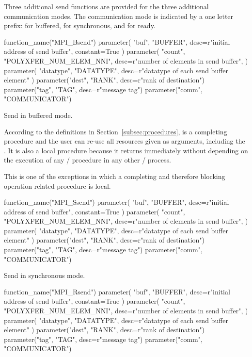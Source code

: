 Three additional send functions are provided for the three additional
communication
modes.  The communication mode is indicated by a one letter prefix:
 for buffered,
 for synchronous, and
 for ready.

\begin{mpi-binding}
    function_name("MPI_Bsend")
    parameter(
        "buf", "BUFFER", desc=r"initial address of send buffer", constant=True
    )
    parameter(
        "count",
        "POLYXFER_NUM_ELEM_NNI",
        desc=r"number of elements in send buffer",
    )
    parameter(
        "datatype", "DATATYPE", desc=r"datatype of each send buffer element"
    )
    parameter("dest", "RANK", desc=r"rank of destination")
    parameter("tag", "TAG", desc=r"message tag")
    parameter("comm", "COMMUNICATOR")
\end{mpi-binding}

Send in buffered mode.

According to the definitions in Section~\ref{subsec:procedures},
 is a completing procedure and the user can re-use
all resources given as arguments, including the .
It is also a local procedure because it returns immediately without
depending on the execution of any \MPI/ procedure in any other \MPI/ process.
\begin{users}
This is one of the exceptions in which a completing and therefore blocking operation-related procedure is local.
\end{users}

\begin{mpi-binding}
    function_name("MPI_Ssend")
    parameter(
        "buf", "BUFFER", desc=r"initial address of send buffer", constant=True
    )
    parameter(
        "count",
        "POLYXFER_NUM_ELEM_NNI",
        desc=r"number of elements in send buffer",
    )
    parameter(
        "datatype", "DATATYPE", desc=r"datatype of each send buffer element"
    )
    parameter("dest", "RANK", desc=r"rank of destination")
    parameter("tag", "TAG", desc=r"message tag")
    parameter("comm", "COMMUNICATOR")
\end{mpi-binding}

Send in synchronous mode.

\begin{mpi-binding}
    function_name("MPI_Rsend")
    parameter(
        "buf", "BUFFER", desc=r"initial address of send buffer", constant=True
    )
    parameter(
        "count",
        "POLYXFER_NUM_ELEM_NNI",
        desc=r"number of elements in send buffer",
    )
    parameter(
        "datatype", "DATATYPE", desc=r"datatype of each send buffer element"
    )
    parameter("dest", "RANK", desc=r"rank of destination")
    parameter("tag", "TAG", desc=r"message tag")
    parameter("comm", "COMMUNICATOR")
\end{mpi-binding}

